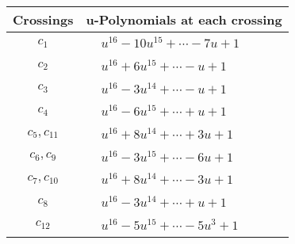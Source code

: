 \documentclass[1p]{elsarticle_modified}
\theoremstyle{definition}
\begin{document}
\begin{tabular}{m{50pt}|m{274pt}}
Crossings & \hspace{64pt}u-Polynomials at each crossing \\
\hline $$\begin{aligned}c_{1}\end{aligned}$$&$\begin{aligned}
&u^{16}-10 u^{15}+\cdots-7 u+1
\end{aligned}$\\
\hline $$\begin{aligned}c_{2}\end{aligned}$$&$\begin{aligned}
&u^{16}+6 u^{15}+\cdots- u+1
\end{aligned}$\\
\hline $$\begin{aligned}c_{3}\end{aligned}$$&$\begin{aligned}
&u^{16}-3 u^{14}+\cdots- u+1
\end{aligned}$\\
\hline $$\begin{aligned}c_{4}\end{aligned}$$&$\begin{aligned}
&u^{16}-6 u^{15}+\cdots+u+1
\end{aligned}$\\
\hline $$\begin{aligned}c_{5},c_{11}\end{aligned}$$&$\begin{aligned}
&u^{16}+8 u^{14}+\cdots+3 u+1
\end{aligned}$\\
\hline $$\begin{aligned}c_{6},c_{9}\end{aligned}$$&$\begin{aligned}
&u^{16}-3 u^{15}+\cdots-6 u+1
\end{aligned}$\\
\hline $$\begin{aligned}c_{7},c_{10}\end{aligned}$$&$\begin{aligned}
&u^{16}+8 u^{14}+\cdots-3 u+1
\end{aligned}$\\
\hline $$\begin{aligned}c_{8}\end{aligned}$$&$\begin{aligned}
&u^{16}-3 u^{14}+\cdots+u+1
\end{aligned}$\\
\hline $$\begin{aligned}c_{12}\end{aligned}$$&$\begin{aligned}
&u^{16}-5 u^{15}+\cdots-5 u^3+1
\end{aligned}$\\
\hline
\end{tabular}\\~\\
\end{document}
